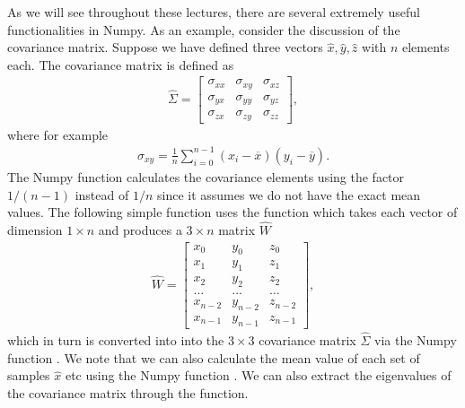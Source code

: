 \documentclass[letterpaper,10pt,english]{sphinxmanual}
\begin{document}
As we will see throughout these lectures, there are several extremely useful functionalities in Numpy.
As an example, consider the discussion of the covariance matrix. Suppose we have defined three vectors
\(\hat{x}, \hat{y}, \hat{z}\) with \(n\) elements each. The covariance matrix is defined as
\begin{equation*}
\begin{split}
\hat{\Sigma} = \begin{bmatrix} \sigma_{xx} & \sigma_{xy} & \sigma_{xz} \\
                              \sigma_{yx} & \sigma_{yy} & \sigma_{yz} \\
                              \sigma_{zx} & \sigma_{zy} & \sigma_{zz} 
             \end{bmatrix},
\end{split}
\end{equation*}
where for example
\begin{equation*}
\begin{split}
\sigma_{xy} =\frac{1}{n} \sum_{i=0}^{n-1}(x_i- \overline{x})(y_i- \overline{y}).
\end{split}
\end{equation*}
The Numpy function  calculates the covariance elements using the factor \(1/(n-1)\) instead of \(1/n\) since it assumes we do not have the exact mean values.
The following simple function uses the  function which takes each vector of dimension \(1\times n\) and produces a \(3\times n\) matrix \(\hat{W}\)
\begin{equation*}
\begin{split}
\hat{W} = \begin{bmatrix} x_0 & y_0 & z_0 \\
                          x_1 & y_1 & z_1 \\
                          x_2 & y_2 & z_2 \\
                          \dots & \dots & \dots \\
                          x_{n-2} & y_{n-2} & z_{n-2} \\
                          x_{n-1} & y_{n-1} & z_{n-1}
             \end{bmatrix},
\end{split}
\end{equation*}
which in turn is converted into into the \(3\times 3\) covariance matrix
\(\hat{\Sigma}\) via the Numpy function . We note that we can also calculate
the mean value of each set of samples \(\hat{x}\) etc using the Numpy
function . We can also extract the eigenvalues of the
covariance matrix through the  function.
\end{document}
